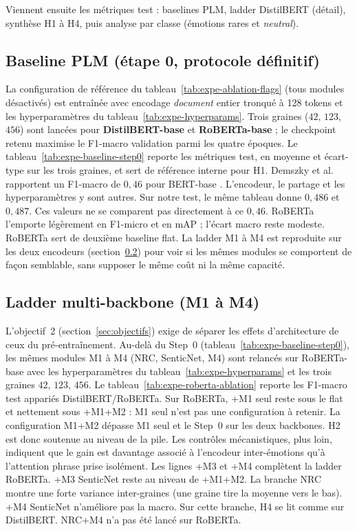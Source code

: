 Viennent ensuite les métriques test : baselines PLM, ladder DistilBERT
(détail), synthèse H1 à H4, puis analyse par classe (émotions rares et
\emph{neutral}).

\subsection{Baseline PLM (étape 0, protocole définitif)}
\label{sec:expe-baseline-distilbert}

La configuration de référence du tableau~\ref{tab:expe-ablation-flags}
(tous modules désactivés) est entraînée avec encodage \emph{document}
entier tronqué à 128 tokens et les hyperparamètres du
tableau~\ref{tab:expe-hyperparams}. Trois graines ($42$, $123$, $456$)
sont lancées pour \textbf{DistilBERT-base} \cite{sanh2019distilbert} et
\textbf{RoBERTa-base} \cite{liu2019roberta} ; le checkpoint retenu
maximise le F1-macro validation parmi les quatre époques. Le
tableau~\ref{tab:expe-baseline-step0} reporte les métriques test, en
moyenne et écart-type sur les trois graines, et sert de référence
interne pour H1. Demszky et al. rapportent un F1-macro de $0{,}46$ pour
BERT-base \cite{demszky2020}. L'encodeur, le partage et les
hyperparamètres y sont autres. Sur notre test, le même tableau donne
$0{,}486$ et $0{,}487$. Ces valeurs ne se comparent pas directement à ce
$0{,}46$.
RoBERTa l'emporte légèrement en F1-micro et en mAP ; l'écart macro reste
modeste. RoBERTa sert de deuxième baseline flat. La ladder M1 à M4 est
reproduite sur les deux encodeurs
(section~\ref{sec:expe-roberta-ablation}) pour voir si les mêmes modules
se comportent de façon semblable, sans supposer le même coût ni la même
capacité.

\subsection{Ladder multi-backbone (M1 à M4)}
\label{sec:expe-roberta-ablation}

L'objectif~2 (section~\ref{sec:objectifs}) exige de séparer les
effets d'architecture de ceux du pré-entraînement. Au-delà du Step~0
(tableau~\ref{tab:expe-baseline-step0}), les mêmes modules M1 à M4
(NRC, SenticNet, M4) sont relancés sur RoBERTa-base avec les
hyperparamètres du tableau~\ref{tab:expe-hyperparams} et les trois
graines $42$, $123$, $456$. Le tableau~\ref{tab:expe-roberta-ablation}
reporte les F1-macro test appariés DistilBERT/RoBERTa. Sur RoBERTa,
+M1 seul reste sous le flat et nettement sous +M1+M2 : M1 seul n'est pas
une configuration à retenir. La configuration M1+M2 dépasse M1 seul et
le Step~0 sur les deux backbones. H2 est donc soutenue au niveau de la
pile. Les contrôles mécanistiques, plus loin, indiquent que le gain est
davantage associé à l'encodeur inter-émotions qu'à l'attention phrase
prise isolément. Les lignes +M3 et +M4 complètent la ladder RoBERTa.
+M3 SenticNet reste au niveau de +M1+M2. La branche NRC montre une
forte variance inter-graines (une graine tire la moyenne vers le bas).
+M4 SenticNet n'améliore pas la macro. Sur cette branche, H4 se lit
comme sur DistilBERT. NRC+M4 n'a pas été lancé sur RoBERTa.

